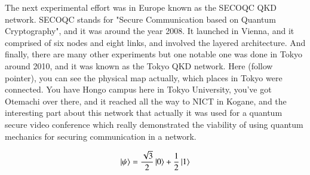 The next experimental effort was in Europe known as the SECOQC QKD network. SECOQC stands for "Secure Communication based on Quantum Cryptography", and it was around the year 2008. It launched in Vienna, and it comprised of six nodes and eight links, and involved the layered architecture. And finally, there are many other experiments but one notable one was done in Tokyo around 2010, and it was known as the Tokyo QKD network. Here (follow pointer), you can see the physical map actually, which places in Tokyo were connected. You have Hongo campus here in Tokyo University, you've got Otemachi over there, and it reached all the way to NICT in Kogane, and the interesting part about this network that actually it was used for a quantum secure video conference which really demonstrated the viability of using quantum mechanics for securing communication in a network.


\newpage
\begin{exercises}
\begin{equation*}
\ket{\psi} = \frac{\sqrt{3}}{2}\ket{0} + \frac{1}{2}\ket{1}
\end{equation*}


\end{exercises}

